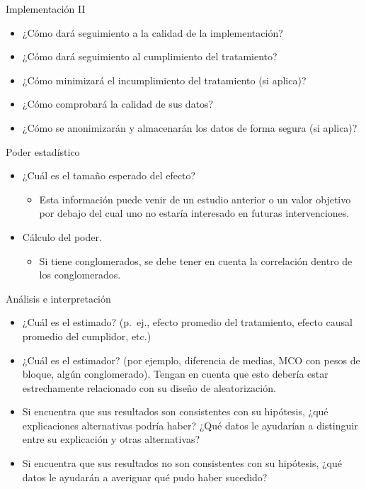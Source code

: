 \documentclass[
  ignorenonframetext,
]{beamer}
\providecommand{\tightlist}{%
  \setlength{\itemsep}{0pt}\setlength{\parskip}{0pt}}
\begin{document}
\begin{frame}{Implementación II}
\protect\hypertarget{implementaciuxf3n-ii}{}
\begin{itemize}
\item
  ¿Cómo dará seguimiento a la calidad de la implementación?
\item
  ¿Cómo dará seguimiento al cumplimiento del tratamiento?
\item
  ¿Cómo minimizará el incumplimiento del tratamiento (si aplica)?
\item
  ¿Cómo comprobará la calidad de sus datos?
\item
  ¿Cómo se anonimizarán y almacenarán los datos de forma segura (si
  aplica)?
\end{itemize}
\end{frame}

\begin{frame}{Poder estadístico}
\protect\hypertarget{poder-estaduxedstico}{}
\begin{itemize}
\item
  ¿Cuál es el tamaño esperado del efecto?

  \begin{itemize}
  \tightlist
  \item
    Esta información puede venir de un estudio anterior o un valor
    objetivo por debajo del cual uno no estaría interesado en futuras
    intervenciones.
  \end{itemize}
\item
  Cálculo del poder.

  \begin{itemize}
  \tightlist
  \item
    Si tiene conglomerados, se debe tener en cuenta la correlación
    dentro de los conglomerados.
  \end{itemize}
\end{itemize}
\end{frame}

\begin{frame}{Análisis e interpretación}
\protect\hypertarget{anuxe1lisis-e-interpretaciuxf3n}{}
\begin{itemize}
\item
  ¿Cuál es el estimado? (p.~ej., efecto promedio del tratamiento, efecto
  causal promedio del cumplidor, etc.)
\item
  ¿Cuál es el estimador? (por ejemplo, diferencia de medias, MCO con
  pesos de bloque, algún conglomerado). Tengan en cuenta que esto
  debería estar estrechamente relacionado con su diseño de
  aleatorización.
\item
  Si encuentra que sus resultados son consistentes con su hipótesis,
  ¿qué explicaciones alternativas podría haber? ¿Qué datos le ayudarían
  a distinguir entre su explicación y otras alternativas?
\item
  Si encuentra que sus resultados no son consistentes con su hipótesis,
  ¿qué datos le ayudarán a averiguar qué pudo haber sucedido?
\end{itemize}
\end{frame}
\end{document}
